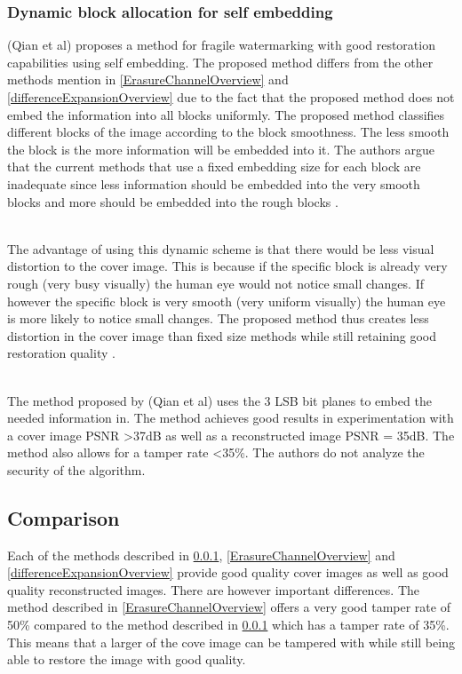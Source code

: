 \documentclass[12pt]{article}
\begin{document}
\subsubsection{Dynamic block allocation for self embedding}
\label{DynamicBlockOverview}
(Qian et al) \cite{qian2011image} proposes a method for fragile watermarking with good restoration capabilities using self embedding.
The proposed method differs from the other methods mention in \ref{ErasureChannelOverview} and \ref{differenceExpansionOverview} due to the fact that the proposed method does not embed the information into all blocks uniformly.
The proposed method classifies different blocks of the image according to the block smoothness.
The less smooth the block is the more information will be embedded into it.
The authors argue that the current methods that use a fixed embedding size for each block are inadequate since less information should be embedded into the very smooth blocks and more should be embedded into the rough blocks \cite{qian2011image}.

\hspace{0pt} \\
The advantage of using this dynamic scheme is that there would be less visual distortion to the cover image. 
This is because if the specific block is already very rough (very busy visually) the human eye would not notice small changes.
If however the specific block is very smooth (very uniform visually) the human eye is more likely to notice small changes.
The proposed method thus creates less distortion in the cover image than fixed size methods while still retaining good restoration quality \cite{qian2011image}. 

\hspace{0pt} \\
The method proposed by (Qian et al) \cite{qian2011image} uses the 3 LSB bit planes to embed the needed information in.
The method achieves good results in experimentation with a cover image PSNR \textgreater 37dB as well as a reconstructed image PSNR = 35dB.
The method also allows for a tamper rate \textless 35\%.
The authors do not analyze the security of the algorithm.

\subsection{Comparison}
Each of the methods described in \ref{DynamicBlockOverview}, \ref{ErasureChannelOverview} and \ref{differenceExpansionOverview} provide good quality cover images as well as good quality reconstructed images.
There are however important differences.
The method described in \ref{ErasureChannelOverview} offers a very good tamper rate of 50\% compared to the method described in \ref{DynamicBlockOverview} which has a tamper rate of 35\%.
This means that a larger of the cove image can be tampered with while still being able to restore the image with good quality.
\end{document}
